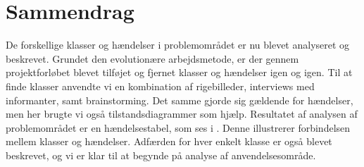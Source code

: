 \section{Sammendrag}

De forskellige klasser og hændelser i problemområdet er nu blevet analyseret og beskrevet. Grundet den evolutionære arbejdsmetode, er der gennem projektforløbet blevet tilføjet og fjernet klasser og hændelser igen og igen. Til at finde klasser anvendte vi en kombination af rigebilleder, interviews med informanter, samt brainstorming. Det samme gjorde sig gældende for hændelser, men her brugte vi også tilstandsdiagrammer som hjælp. Resultatet af analysen af problemområdet er en hændelsestabel, som ses i . Denne illustrerer forbindelsen mellem klasser og hændelser. Adfærden for hver enkelt klasse er også blevet beskrevet, og vi er klar til at begynde på analyse af anvendelsesområde. 